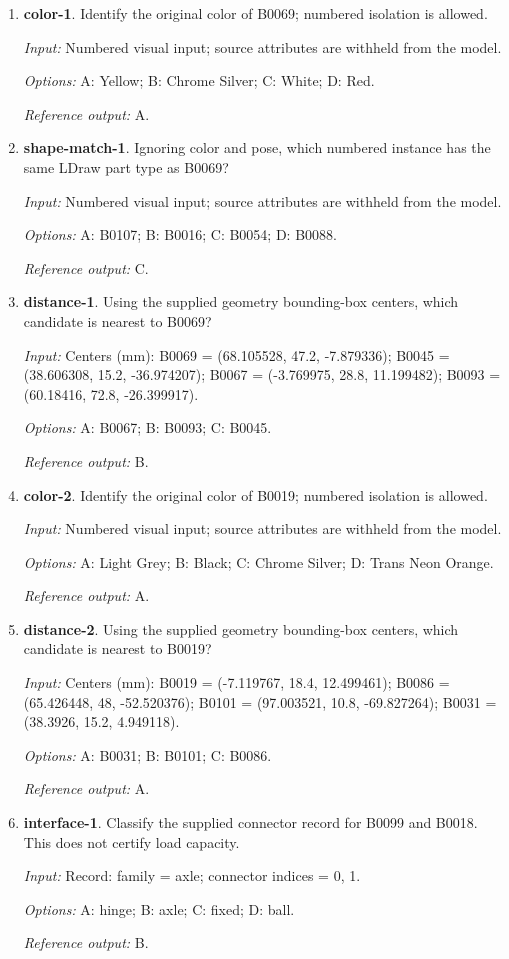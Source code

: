 \begin{enumerate}
\item \textbf{color-1}. Identify the original color of B0069; numbered isolation is allowed.\par {\small \textit{Input:} Numbered visual input; source attributes are withheld from the model. \par\textit{Options:} A: Yellow; B: Chrome Silver; C: White; D: Red. \par\textit{Reference output:} A.}
\item \textbf{shape-match-1}. Ignoring color and pose, which numbered instance has the same LDraw part type as B0069?\par {\small \textit{Input:} Numbered visual input; source attributes are withheld from the model. \par\textit{Options:} A: B0107; B: B0016; C: B0054; D: B0088. \par\textit{Reference output:} C.}
\item \textbf{distance-1}. Using the supplied geometry bounding-box centers, which candidate is nearest to B0069?\par {\small \textit{Input:} Centers (mm): B0069 = (68.105528, 47.2, -7.879336); B0045 = (38.606308, 15.2, -36.974207); B0067 = (-3.769975, 28.8, 11.199482); B0093 = (60.18416, 72.8, -26.399917). \par\textit{Options:} A: B0067; B: B0093; C: B0045. \par\textit{Reference output:} B.}
\item \textbf{color-2}. Identify the original color of B0019; numbered isolation is allowed.\par {\small \textit{Input:} Numbered visual input; source attributes are withheld from the model. \par\textit{Options:} A: Light Grey; B: Black; C: Chrome Silver; D: Trans Neon Orange. \par\textit{Reference output:} A.}
\item \textbf{distance-2}. Using the supplied geometry bounding-box centers, which candidate is nearest to B0019?\par {\small \textit{Input:} Centers (mm): B0019 = (-7.119767, 18.4, 12.499461); B0086 = (65.426448, 48, -52.520376); B0101 = (97.003521, 10.8, -69.827264); B0031 = (38.3926, 15.2, 4.949118). \par\textit{Options:} A: B0031; B: B0101; C: B0086. \par\textit{Reference output:} A.}
\item \textbf{interface-1}. Classify the supplied connector record for B0099 and B0018. This does not certify load capacity.\par {\small \textit{Input:} Record: family = axle; connector indices = 0, 1. \par\textit{Options:} A: hinge; B: axle; C: fixed; D: ball. \par\textit{Reference output:} B.}

\end{enumerate}
